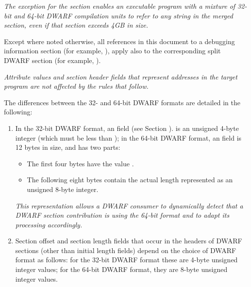 \textit{The exception for the \dotdebugstroffsets{} section enables 
an executable program with a mixture of 32-bit and 64-bit DWARF compilation 
units to refer to any string in the merged \dotdebugstr{} section, 
even if that section exceeds 4GB in size.}
\eb

Except where noted otherwise, all references in this document
to a debugging information section (for example, \dotdebuginfo),
apply also to the corresponding split DWARF section (for example,
\dotdebuginfodwo).

\bb
\textit{Attribute values and section header fields that represent
addresses in the target program are not affected by the rules that 
follow.}
\eb

The differences between the 32- and 64-bit DWARF formats are
detailed in the following:
\begin{enumerate}[1. ]

\item  In the 32-bit DWARF format, an 
 field 
\bb
(see Section ).
\eb
is an unsigned 4-byte integer (which
must be less than \xfffffffzero); in the 64-bit DWARF format,
an  field is 12 bytes in size,
and has two parts:
\begin{itemize}
\item The first four bytes have the value \xffffffff.

\item  The following eight bytes contain the actual length
represented as an unsigned 8-byte integer.
\end{itemize}

\textit{This representation allows a DWARF consumer to dynamically
detect that a DWARF section contribution is using the 64-bit
format and to adapt its processing accordingly.}

\item \hypertarget{datarep:sectionoffsetlength}{}
Section offset and section length
fields that occur
in the headers of DWARF sections (other than initial length
fields) 
\bb
depend on the choice of DWARF format as follows: for
\eb
the 32-bit DWARF format these are 4-byte unsigned integer values; 
\bb
for
\eb
the 64-bit DWARF format, they are 8-byte unsigned integer values.


\end{enumerate}
